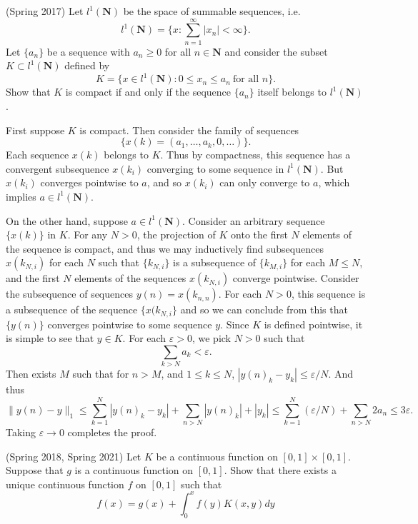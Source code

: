 \documentclass{exam}
\theoremstyle{problemstyle}
\newcommand{\1}[1]{\textbf{1}_{\left[#1\right]}} %
\begin{document}
\begin{questions}
\question (Spring 2017)
    Let $l^1(\mathbf{N})$ be the space of summable sequences, i.e.
    \[ l^1(\mathbf{N}) = \{ x : \sum_{n = 1}^\infty |x_n| < \infty \}. \]
    Let $\{ a_n \}$ be a sequence with $a_n \geq 0$ for all $n \in \mathbf{N}$ and consider the subset $K \subset l^1(\mathbf{N})$ defined by
    \[ K = \{ x \in l^1(\mathbf{N}) : 0 \leq x_n \leq a_n\ \text{for all $n$} \}. \]
    Show that $K$ is compact if and only if the sequence $\{ a_n \}$ itself belongs to $l^1(\mathbf{N})$.
\begin{solution}
    First suppose $K$ is compact. Then consider the family of sequences
    \[ \{ x(k) = (a_1,\dots,a_k,0,\dots) \}. \]
    Each sequence $x(k)$ belongs to $K$. Thus by compactness, this sequence has a convergent subsequence $x(k_i)$ converging to some sequence in $l^1(\mathbf{N})$. But $x(k_i)$ converges pointwise to $a$, and so $x(k_i)$ can only converge to $a$, which implies $a \in l^1(\mathbf{N})$.
    
    On the other hand, suppose $a \in l^1(\mathbf{N})$. Consider an arbitrary sequence $\{ x(k) \}$ in $K$. For any $N > 0$, the projection of $K$ onto the first $N$ elements of the sequence is compact, and thus we may inductively find subsequences $x(k_{N,i})$ for each $N$ such that $\{ k_{N,i} \}$ is a subsequence of $\{ k_{M,i} \}$ for each $M \leq N$, and the first $N$ elements of the sequences $x(k_{N,i})$ converge pointwise. Consider the subsequence of sequences $y(n) = x(k_{n,n})$. For each $N > 0$, this sequence is a subsequence of the sequence $\{ x(k_{N,i} \}$ and so we can conclude from this that $\{ y(n) \}$ converges pointwise to some sequence $y$. Since $K$ is defined pointwise, it is simple to see that $y \in K$. For each $\varepsilon > 0$, we pick $N > 0$ such that
    \[ \sum_{k > N} a_k < \varepsilon. \]
    Then exists $M$ such that for $n > M$, and $1 \leq k \leq N$, $|y(n)_k - y_k| \leq \varepsilon / N$. And thus
    \[ \| y(n) - y \|_1 \leq \sum_{k = 1}^N |y(n)_k - y_k| + \sum_{n > N} |y(n)_k| + |y_k| \leq \sum_{k = 1}^N (\varepsilon / N) + \sum_{n > N} 2a_n \leq 3\varepsilon. \]
    Taking $\varepsilon \to 0$ completes the proof.
\end{solution}

\question (Spring 2018, Spring 2021)
  Let $K$ be a continuous function on $[0,1]\times [0,1]$. Suppose that $g$ is a continuous function on $[0,1]$. Show that there exists a unique continuous function $f$ on $[0,1]$ such that
  \begin{equation*}
    f(x)=g(x)+\int_{0}^{x}f(y)K(x,y)dy
  \end{equation*}


\end{questions}
\end{document}
